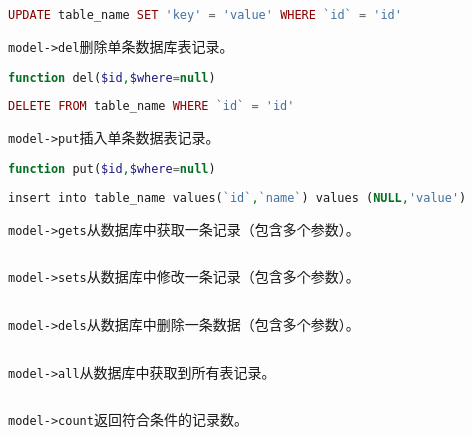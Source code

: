 \begin{lstlisting}[language=PHP]
UPDATE table_name SET 'key' = 'value' WHERE `id` = 'id'
\end{lstlisting}

\texttt{model->del}删除单条数据库表记录。

\begin{lstlisting}[language=PHP]
function del($id,$where=null)
\end{lstlisting}


\begin{lstlisting}[language=PHP]
DELETE FROM table_name WHERE `id` = 'id'
\end{lstlisting}



\texttt{model->put}插入单条数据表记录。

\begin{lstlisting}[language=PHP]
function put($id,$where=null)
\end{lstlisting}



\begin{lstlisting}[language=PHP]
insert into table_name values(`id`,`name`) values (NULL,'value')
\end{lstlisting}

\texttt{model->gets}从数据库中获取一条记录（包含多个参数）。

\begin{lstlisting}[language=PHP]

\end{lstlisting}

\texttt{model->sets}从数据库中修改一条记录（包含多个参数）。

\begin{lstlisting}[language=PHP]

\end{lstlisting}


\texttt{model->dels}从数据库中删除一条数据（包含多个参数）。

\begin{lstlisting}[language=PHP]

\end{lstlisting}

\texttt{model->all}从数据库中获取到所有表记录。


\begin{lstlisting}[language=PHP]

\end{lstlisting}


\texttt{model->count}返回符合条件的记录数。




